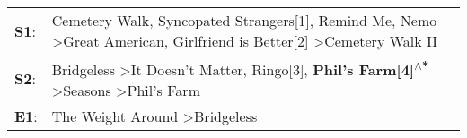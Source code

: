 \begin{supertabular}{p{0.03\textwidth}p{0.92\textwidth}}
 \textbf{S1}:  &  Cemetery Walk\textsuperscript{}, \enspace Syncopated Strangers[1]\textsuperscript{}, \enspace Remind Me\textsuperscript{}, \enspace Nemo\textsuperscript{} \textgreater \enspace Great American\textsuperscript{}, \enspace Girlfriend is Better[2]\textsuperscript{} \textgreater \enspace Cemetery Walk II\textsuperscript{}  \enspace  \\
 \textbf{S2}:  &                                    Bridgeless\textsuperscript{} \textgreater \enspace It Doesn't Matter\textsuperscript{}, \enspace Ringo[3]\textsuperscript{}, \enspace \textbf{Phil's Farm[4]\textsuperscript{$\wedge$*}} \textgreater \enspace Seasons\textsuperscript{} \textgreater \enspace Phil's Farm\textsuperscript{}  \enspace  \\
 \textbf{E1}:  &                                                                                                                                                                                                                                          The Weight Around\textsuperscript{} \textgreater \enspace Bridgeless\textsuperscript{}  \enspace  \\
\end{supertabular}
